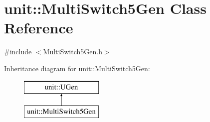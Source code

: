 \hypertarget{classunit_1_1MultiSwitch5Gen}{\section{unit\-:\-:Multi\-Switch5\-Gen Class Reference}
\label{classunit_1_1MultiSwitch5Gen}
}


{\ttfamily \#include $<$Multi\-Switch5\-Gen.\-h$>$}

Inheritance diagram for unit\-:\-:Multi\-Switch5\-Gen\-:\begin{figure}[H]
\begin{center}
\leavevmode
\includegraphics[height=2.000000cm]{classunit_1_1MultiSwitch5Gen}
\end{center}
\end{figure}
